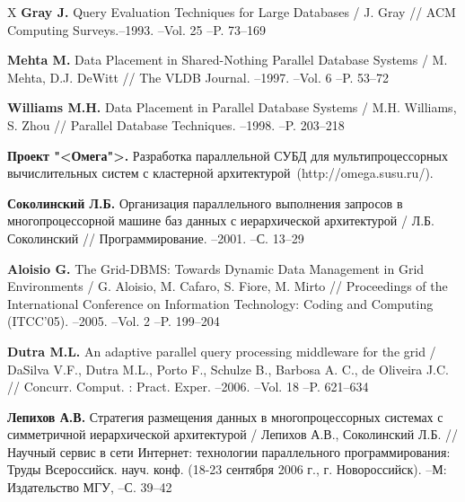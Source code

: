 \documentclass[11pt,oneside]{article}
\begin{document}
\begin{thebibliography}{X}
 {\bf Gray J.} {\sf Query Evaluation Techniques for Large Databases} / J. Gray // ACM Computing Surveys.--1993. --Vol. 25  --P. 73--169\vspace{-2mm}

 {\bf Mehta M.} {\sf Data Placement in Shared-Nothing Parallel Database Systems} / M. Mehta, D.J. DeWitt // The VLDB Journal. --1997. --Vol. 6  --P. 53--72\vspace{-2mm}

 {\bf Williams M.H.} {\sf Data Placement in Parallel Database Systems} / M.H. Williams, S. Zhou // Parallel Database Techniques. --1998. --P. 203--218\vspace{-2mm}

 {\bf Проект "<Омега">.} {\sf  Разработка параллельной СУБД для мультипроцессорных вычислительных систем с кластерной архитектурой}\ (http://omega.susu.ru/).


 {\bf Соколинский Л.Б.} {\sf Организация параллельного выполнения запросов в многопроцессорной машине баз данных с иерархической архитектурой} / Л.Б. Соколинский // Программирование. --2001.  --С. 13--29\vspace{-2mm}

 {\bf Aloisio G.} {\sf The Grid-DBMS: Towards Dynamic Data Management in Grid Environments} / G. Aloisio, M. Cafaro, S. Fiore, M. Mirto // Proceedings of the International Conference on Information Technology: Coding and Computing (ITCC'05). --2005. --Vol. 2 --P. 199--204\vspace{-2mm}

 {\bf Dutra M.L.} {\sf An adaptive parallel query processing middleware for the grid} / DaSilva V.F., Dutra M.L., Porto F., Schulze B., Barbosa A. C., de Oliveira J.C. // Concurr. Comput. : Pract. Exper. --2006. --Vol. 18  --P. 621--634\vspace{-2mm}

 {\bf Лепихов А.В.} {\sf Стратегия размещения данных в многопроцессорных системах с симметричной иерархической архитектурой} / Лепихов А.В., Соколинский Л.Б. // Научный сервис в сети Интернет: технологии параллельного программирования: Труды Всероссийск. науч. конф. (18-23 сентября 2006 г., г. Новороссийск). --М: Издательство МГУ, --С. 39--42\vspace{-2mm}


\end{thebibliography}
\end{document}
